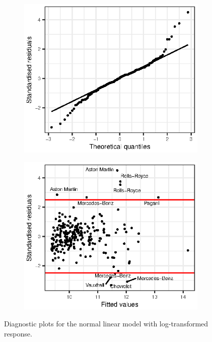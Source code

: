 \documentclass[titlepage]{article}
\begin{document}
\begin{figure}[!htb]
  \begin{subfigure}{0.5\linewidth}
    \includegraphics{q3-qq-tf}
    \label{fig:q3-qq-tf}
  \end{subfigure}
  \begin{subfigure}{0.5\linewidth}
    \includegraphics{q3-resids-vs-fitted-tf}
    \label{fig:q3-resids-vs-fitted-tf}
  \end{subfigure}
  \caption{Diagnostic plots for the normal linear model with log-transformed response.}
\end{figure}
\end{document}

